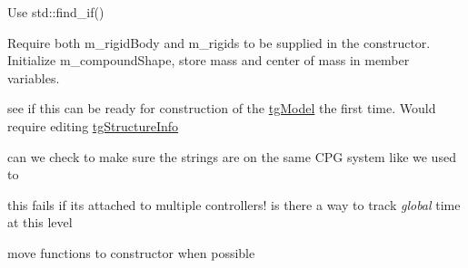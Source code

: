 \begin{DoxyRefList}
Use std\-::find\-\_\-if()  
\item[\label{todo__todo000068}%
\hypertarget{todo__todo000068}{}%
Member \hyperlink{classtg_compound_rigid_info_aa14e89fb681677147ae38737455cb960}{tg\-Compound\-Rigid\-Info\-:\-:tg\-Compound\-Rigid\-Info} ()]Require both m\-\_\-rigid\-Body and m\-\_\-rigids to be supplied in the constructor. Initialize m\-\_\-compound\-Shape, store mass and center of mass in member variables.  
\item[\label{todo__todo000047}%
\hypertarget{todo__todo000047}{}%
Member \hyperlink{classtg_c_p_g_info_a5bc9ebf51c48c38e3c079047bdfaa41f}{tg\-C\-P\-G\-Info\-:\-:add\-Control\-Info} (\hyperlink{classtg_base_c_p_g_node}{tg\-Base\-C\-P\-G\-Node} $\ast$string)]see if this can be ready for construction of the \hyperlink{classtg_model}{tg\-Model} the first time. Would require editing \hyperlink{classtg_structure_info}{tg\-Structure\-Info}  
\item[\label{todo__todo000046}%
\hypertarget{todo__todo000046}{}%
Member \hyperlink{classtg_c_p_g_info_ae6196de220c88e8631b863e0d63d1d7f}{tg\-C\-P\-G\-Info\-:\-:set\-Connectivity} (\hyperlink{classtg_connector_info}{tg\-Connector\-Info} $\ast$this\-String, std\-::vector$<$ tg\-Connector\-Info $\ast$ $>$ all\-Strings, array\-\_\-4\-D edge\-Params)]can we check to make sure the strings are on the same C\-P\-G system like we used to  
\item[\label{todo__todo000048}%
\hypertarget{todo__todo000048}{}%
Member \hyperlink{classtg_c_p_g_string_control_a86ba4af920798c9f6cda4bbc5b1880e0}{tg\-C\-P\-G\-String\-Control\-:\-:on\-Step} (\hyperlink{classtg_linear_string}{tg\-Linear\-String} \&subject, double dt)]this fails if its attached to multiple controllers! is there a way to track {\itshape global} time at this level  
\item[\label{todo__todo000060}%
\hypertarget{todo__todo000060}{}%
Member \hyperlink{classtg_data_observer_ab875570fe88ead645d443caf00ebb2d0}{tg\-Data\-Observer\-:\-:on\-Setup} (\hyperlink{classtg_model}{tg\-Model} \&model)]move functions to constructor when possible 


\end{DoxyRefList}
